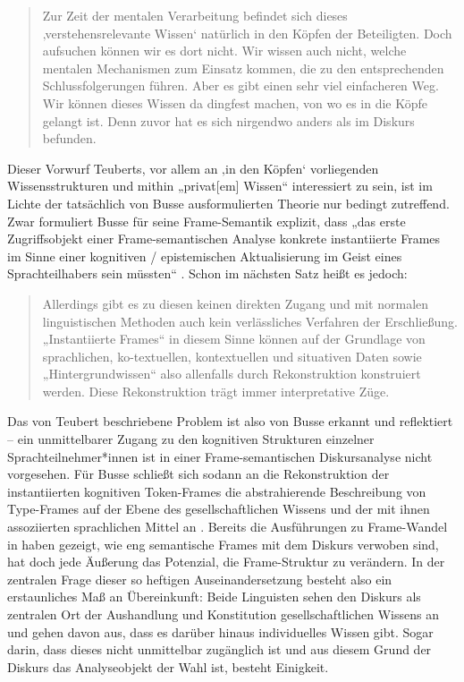 \begin{quote}
Zur Zeit der mentalen Verarbeitung befindet sich dieses ‚verstehensrelevante Wissen` natürlich in den Köpfen der Beteiligten. Doch aufsuchen können wir es dort nicht. Wir wissen auch nicht, welche mentalen Mechanismen zum Einsatz kommen, die zu den entsprechenden Schlussfolgerungen führen. Aber es gibt einen sehr viel einfacheren Weg. Wir können dieses Wissen da dingfest machen, von wo es in die Köpfe gelangt ist. Denn zuvor hat es sich nirgendwo anders als im Diskurs befunden. \autocite[90]{teubertWirklichkeitDiskurses2013}
\end{quote}

Dieser Vorwurf Teuberts, vor allem an ‚in den Köpfen` vorliegenden Wissensstrukturen und mithin „privat{[}em{]} Wissen`` \autocite[85]{teubertWirklichkeitDiskurses2013} interessiert zu sein, ist im Lichte der tatsächlich von Busse ausformulierten Theorie nur bedingt zutreffend. Zwar formuliert Busse für seine Frame-Semantik explizit, dass „das erste Zugriffsobjekt einer Frame-semantischen Analyse konkrete instantiierte Frames im Sinne einer kognitiven / epistemischen Aktualisierung im Geist eines Sprachteilhabers sein müssten`` \autocite[538]{busseFrameSemantikKompendium2012}. Schon im nächsten Satz heißt es jedoch:

\begin{quote}
Allerdings gibt es zu diesen keinen direkten Zugang und mit normalen linguistischen Methoden auch kein verlässliches Verfahren der Erschließung. „Instantiierte Frames`` in diesem Sinne können auf der Grundlage von sprachlichen, ko-textuellen, kontextuellen und situativen Daten sowie „Hintergrundwissen`` also allenfalls durch Rekonstruktion konstruiert werden. Diese Rekonstruktion trägt immer interpretative Züge. \autocite[538]{busseFrameSemantikKompendium2012}
\end{quote}

Das von Teubert beschriebene Problem ist also von Busse erkannt und reflektiert -- ein unmittelbarer Zugang zu den kognitiven Strukturen einzelner Sprachteilnehmer*innen ist in einer Frame-semantischen Diskursanalyse nicht vorgesehen. Für Busse schließt sich sodann an die Rekonstruktion der instantiierten kognitiven Token-Frames die abstrahierende Beschreibung von Type-Frames auf der Ebene des gesellschaftlichen Wissens und der mit ihnen assoziierten sprachlichen Mittel an \autocite[538]{busseFrameSemantikKompendium2012}. Bereits die Ausführungen zu Frame-Wandel in  haben gezeigt, wie eng semantische Frames mit dem Diskurs verwoben sind, hat doch jede Äußerung das Potenzial, die Frame-Struktur zu verändern. In der zentralen Frage dieser so heftigen Auseinandersetzung besteht also ein erstaunliches Maß an Übereinkunft: Beide Linguisten sehen den Diskurs als zentralen Ort der Aushandlung und Konstitution gesellschaftlichen Wissens an und gehen davon aus, dass es darüber hinaus individuelles Wissen gibt. Sogar darin, dass dieses nicht unmittelbar zugänglich ist und aus diesem Grund der Diskurs das Analyseobjekt der Wahl ist, besteht Einigkeit.

